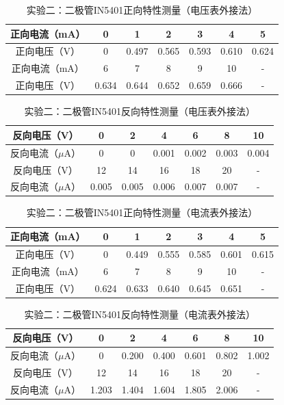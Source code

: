 \documentclass[a4paper]{article}
\begin{document}
    \begin{table}[!ht]
        \caption{实验二：二极管IN5401正向特性测量（电压表外接法）}\label{tab:exp4}
        \begin{tabularx}{\textwidth}{c*{6}{C}} \toprule
            正向电流（mA） & 0 & 1 & 2 & 3 & 4 & 5 \\ \midrule
            正向电压（V） & 0 & 0.497 & 0.565 & 0.593 & 0.610 & 0.624 \\ \midrule
            正向电流（mA） & 6 & 7 & 8 & 9 & 10 & - \\ \midrule
            正向电压（V） & 0.634 & 0.644 & 0.652 & 0.659 & 0.666 & - \\
        \bottomrule
        \end{tabularx}
    \end{table}
    \begin{table}[!ht]
        \caption{实验二：二极管IN5401反向特性测量（电压表外接法）}\label{tab:exp4}
        \begin{tabularx}{\textwidth}{c*{6}{C}} \toprule
            反向电压（V） & 0 & 2 & 4 & 6 & 8 & 10 \\ \midrule
            反向电流（$\mu$A） & 0 & 0 & 0.001 & 0.002 & 0.003 & 0.004 \\ \midrule
            反向电压（V） & 12 & 14 & 16 & 18 & 20 & - \\ \midrule
            反向电流（$\mu$A） & 0.005 & 0.005 & 0.006 & 0.007 & 0.007 & - \\
        \bottomrule
        \end{tabularx}
    \end{table}
    \begin{table}[!ht]
        \caption{实验二：二极管IN5401正向特性测量（电流表外接法）}\label{tab:exp4}
        \begin{tabularx}{\textwidth}{c*{6}{C}} \toprule
            正向电流（mA） & 0 & 1 & 2 & 3 & 4 & 5 \\ \midrule
            正向电压（V） & 0 & 0.449 & 0.555 & 0.585 & 0.601 & 0.615 \\ \midrule
            正向电流（mA） & 6 & 7 & 8 & 9 & 10 & - \\ \midrule
            正向电压（V） & 0.624 & 0.633 & 0.640 & 0.645 & 0.651 & - \\
        \bottomrule
        \end{tabularx}
    \end{table}
    \begin{table}[!ht]
        \caption{实验二：二极管IN5401反向特性测量（电流表外接法）}\label{tab:exp4}
        \begin{tabularx}{\textwidth}{c*{6}{C}} \toprule
            反向电压（V） & 0 & 2 & 4 & 6 & 8 & 10 \\ \midrule
            反向电流（$\mu$A） & 0 & 0.200 & 0.400 & 0.601 & 0.802 & 1.002 \\ \midrule
            反向电压（V） & 12 & 14 & 16 & 18 & 20 & - \\ \midrule
            反向电流（$\mu$A）& 1.203 & 1.404 & 1.604  & 1.805 & 2.006 & - \\
        \bottomrule
        \end{tabularx}
    \end{table}
\end{document}
